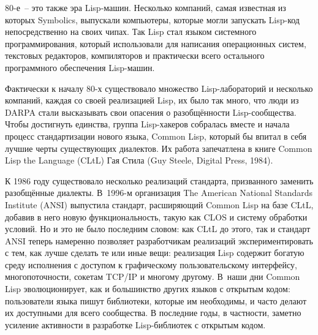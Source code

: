 80-е~-- это также эра Lisp-машин. Несколько компаний, самая известная из которых
Symbolics, выпускали компьютеры, которые могли запускать Lisp-код непосредственно на своих
чипах. Так Lisp стал языком системного программирования, который использовали для
написания операционных систем, текстовых редакторов, компиляторов и практически всего
остального программного обеспечения Lisp-ма\-шин.

Фактически к началу 80-х существовало множество Lisp-ла\-бо\-ра\-то\-рий и несколько компаний,
каждая со своей реализацией Lisp, их было так много, что люди из DARPA стали высказывать
свои опасения о разобщённости Lisp-со\-об\-щест\-ва. Чтобы достигнуть единства, группа
Lisp-ха\-ке\-ров собралась вместе и начала процесс стандартизации нового языка, Common Lisp,
который бы впитал в себя лучшие черты существующих диалектов. Их работа запечатлена в
книге Common Lisp the Language (CLtL) Гая Стила (Guy Steele, Digital Press, 1984).

К 1986 году существовало несколько реализаций стандарта, призванного заменить разобщённые
диалекты. В~1996-м организация The American National Standards Institute (ANSI) выпустила
стандарт, расширяющий Common Lisp на базе CLtL, добавив в него новую функциональность,
такую как CLOS и систему обработки условий. Но и это не было последним словом: как CLtL
до этого, так и стандарт ANSI теперь намеренно позволяет разработчикам реализаций
экспериментировать с тем, как лучше сделать те или иные вещи: реализация Lisp содержит
богатую среду исполнения с доступом к графическому пользовательскому интерфейсу,
многопоточности, сокетам TCP/IP и многому другому. В~наши дни Common Lisp эволюционирует,
как и большинство других языков с открытым кодом: пользователи языка пишут
библиотеки, которые им необходимы, и часто делают их доступными для всего сообщества. В
последние годы, в частности, заметно усиление активности в разработке Lisp-би\-бли\-о\-тек 
с открытым кодом.

